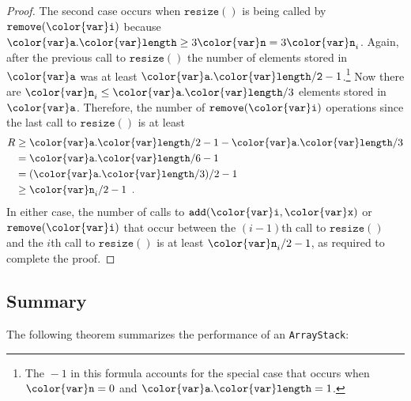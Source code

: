\documentclass[10pt]{book}
\theoremstyle{plain}
\theoremstyle{definition}
\begin{document}
\begin{proof}
  The second case occurs when \ensuremath{\mathtt{resize()}} is being called by
  \ensuremath{\mathtt{remove({\color{var}i})}} because $\ensuremath{\mathtt{{\color{var}a}.{\color{var}length}}} \ge 3\ensuremath{\mathtt{{\color{var}n}}}=3\ensuremath{\mathtt{{\color{var}n}}}_i$.  Again, after the
  previous call to \ensuremath{\mathtt{resize()}} the number of elements stored in \ensuremath{\mathtt{{\color{var}a}}} was
  at least $\ensuremath{\mathtt{{\color{var}a}.{\color{var}length}/2}}-1$.\footnote{The ${}-1$ in this formula accounts for
  the special case that occurs when $\ensuremath{\mathtt{{\color{var}n}}}=0$ and $\ensuremath{\mathtt{{\color{var}a}.{\color{var}length}}} = 1$.} Now there
  are $\ensuremath{\mathtt{{\color{var}n}}}_i\le\ensuremath{\mathtt{{\color{var}a}.{\color{var}length}}}/3$ elements stored in \ensuremath{\mathtt{{\color{var}a}}}.  Therefore, the number
  of \ensuremath{\mathtt{remove({\color{var}i})}} operations since the last call to \ensuremath{\mathtt{resize()}} is at least
  \begin{align*}
      R & \ge \ensuremath{\mathtt{{\color{var}a}.{\color{var}length}}}/2 - 1 - \ensuremath{\mathtt{{\color{var}a}.{\color{var}length}}}/3 \\
        & = \ensuremath{\mathtt{{\color{var}a}.{\color{var}length}}}/6 - 1 \\
        & = (\ensuremath{\mathtt{{\color{var}a}.{\color{var}length}}}/3)/2 - 1 \\
        & \ge \ensuremath{\mathtt{{\color{var}n}}}_i/2 -1\enspace .
  \end{align*}
  In either case, the number of calls to \ensuremath{\mathtt{add({\color{var}i},{\color{var}x})}} or \ensuremath{\mathtt{remove({\color{var}i})}} that
  occur between the $(i-1)$th call to \ensuremath{\mathtt{resize()}} and the $i$th call to
  \ensuremath{\mathtt{resize()}} is at least $\ensuremath{\mathtt{{\color{var}n}}}_i/2-1$, as required to complete the proof.
\end{proof}

\subsection{Summary}

The following theorem summarizes the performance of an \texttt{ArrayStack}:
\end{document}
